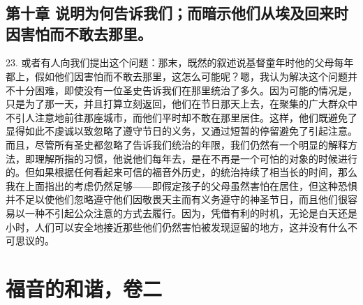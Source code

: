 
\section{}


\subsection{第十章 说明为何告诉我们；而暗示他们从埃及回来时因害怕而不敢去那里。}

23. 或者有人向我们提出这个问题：那末，既然的叙述说基督童年时他的父母每年都上，假如他们因害怕而不敢去那里，这怎么可能呢？嗯，我认为解决这个问题并不十分困难，即使没有一位圣史告诉我们在那里统治了多久。因为可能的情况是，只是为了那一天，并且打算立刻返回，他们在节日那天上去，在聚集的广大群众中不引人注意地前往那座城市，而他们平时却不敢在那里居住。这样，他们既避免了显得如此不虔诚以致忽略了遵守节日的义务，又通过短暂的停留避免了引起注意。而且，尽管所有圣史都忽略了告诉我们统治的年限，我们仍然有一个明显的解释方法，即理解所指的习惯，他说他们每年去，是在不再是一个可怕的对象的时候进行的。但如果根据任何看起来可信的福音外历史，的统治持续了相当长的时间，那么我在上面指出的考虑仍然足够——即假定孩子的父母虽然害怕在居住，但这种恐惧并不足以使他们忽略遵守他们因敬畏天主而有义务遵守的神圣节日，而且他们很容易以一种不引起公众注意的方式去履行。因为，凭借有利的时机，无论是白天还是小时，人们可以安全地接近那些他们仍然害怕被发现逗留的地方，这并没有什么不可思议的。\par



\section{福音的和谐，卷二}

